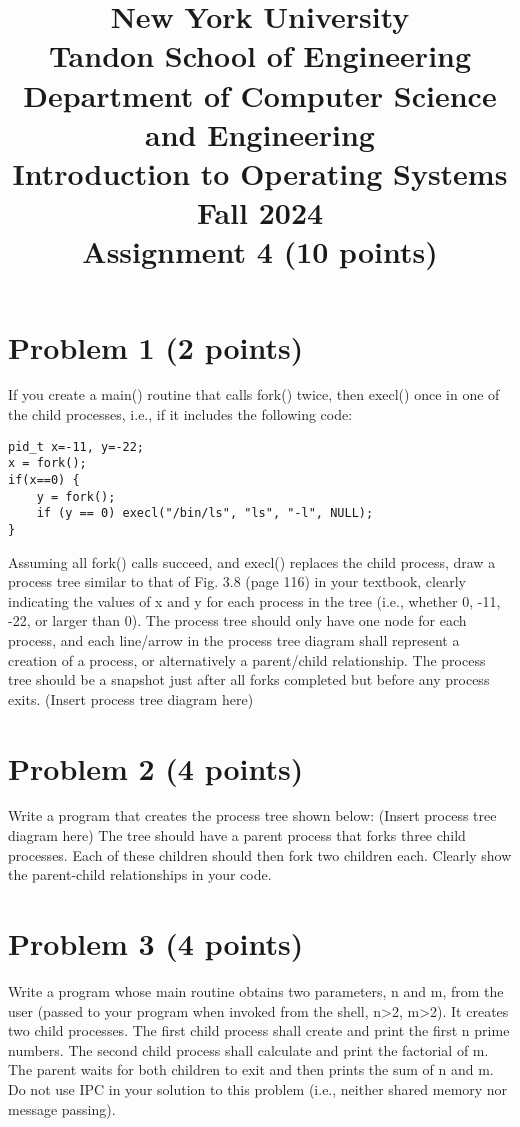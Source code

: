 \documentclass{article}
\title{New York University \\ Tandon School of Engineering \\ Department of Computer Science and Engineering \\ Introduction to Operating Systems \\ Fall 2024 \\ Assignment 4 (10 points)}
\author{}
\date{}
\begin{document}
\maketitle

\section*{Problem 1 (2 points)}

If you create a main() routine that calls fork() twice, then execl() once in one of the child processes, i.e., if it includes the following code:

\begin{verbatim}
pid_t x=-11, y=-22;
x = fork();
if(x==0) {
    y = fork();
    if (y == 0) execl("/bin/ls", "ls", "-l", NULL);
}
\end{verbatim}

Assuming all fork() calls succeed, and execl() replaces the child process, draw a process tree similar to that of Fig. 3.8 (page 116) in your textbook, clearly indicating the values of x and y for each process in the tree (i.e., whether 0, -11, -22, or larger than 0). The process tree should only have one node for each process, and each line/arrow in the process tree diagram shall represent a creation of a process, or alternatively a parent/child relationship. The process tree should be a snapshot just after all forks completed but before any process exits.  (Insert process tree diagram here)


\section*{Problem 2 (4 points)}

Write a program that creates the process tree shown below: (Insert process tree diagram here)  The tree should have a parent process that forks three child processes. Each of these children should then fork two children each.  Clearly show the parent-child relationships in your code.


\section*{Problem 3 (4 points)}

Write a program whose main routine obtains two parameters, n and m, from the user (passed to your program when invoked from the shell, n>2, m>2). It creates two child processes. The first child process shall create and print the first n prime numbers. The second child process shall calculate and print the factorial of m. The parent waits for both children to exit and then prints the sum of n and m. Do not use IPC in your solution to this problem (i.e., neither shared memory nor message passing).
\end{document}
